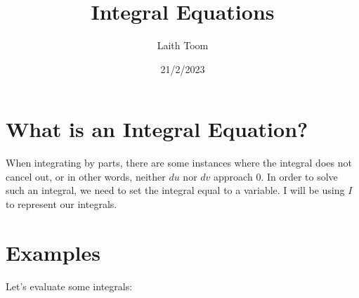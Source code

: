 \documentclass{article}
\title{Integral Equations}
\author{Laith Toom}
\date{21/2/2023}
\begin{document}
\maketitle
\newpage

\section{What is an Integral Equation?}
When integrating by parts, there are some instances where 
the integral does not cancel out, or in other words, 
neither $du$ nor $dv$ approach 0. In order to solve such 
an integral, we need to set the integral equal to a variable.
I will be using $I$ to represent our integrals.

\section{Examples}
Let's evaluate some integrals:
\end{document}
